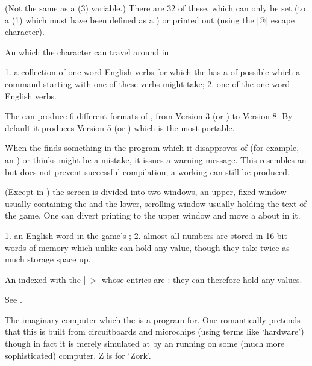 %
(Not the same as a  (3) variable.)  There are 32 of these, which
can only be set (to a  (1) which must have been defined as a
) or printed out (using the |@| escape character).

%
An  which the  character can travel around in.

%
1. a collection of  one-word English verbs for which the
 has a  of possible  which a command starting
with one of these verbs might take; 2. one of the one-word English verbs.

%
The  can produce 6 different formats of , from
Version 3 (or ) to Version 8.  By default it produces Version 5
(or ) which is the most portable.

%
When the  finds something in the program which it disapproves
of (for example, an ) or thinks might be a mistake, it
issues a warning message.  This resembles an  but does not prevent
successful compilation; a working  can still be produced.

%
(Except in ) the screen is divided into two windows, an
upper, fixed window usually containing the  and the lower,
scrolling window usually holding the text of the game.  One can divert
printing to the upper window and move a  about in it.

%
1. an English word in the game's ; 2. almost all numbers are
stored in 16-bit words of memory which unlike  can hold any
 value, though they take twice as much storage space up.

%
An  indexed with the |-->|  whose entries are
: they can therefore hold any  values.

%
See .

%
The imaginary computer which the  is a program for.  One
romantically pretends that this is built from circuitboards and microchips
(using terms like `hardware') though in fact it is merely simulated at
 by an  running on some (much more sophisticated)
computer.  Z is for `Zork'.
\tenpoint

\vfill\eject\lexiconfalse{}

\immediate\closeout\ans

